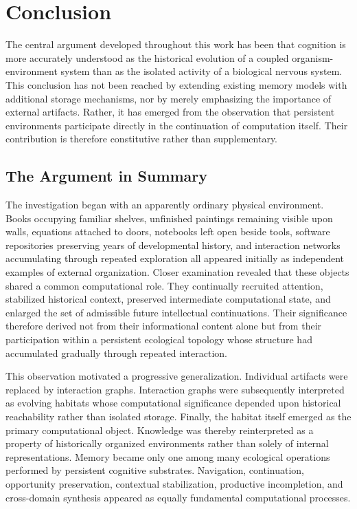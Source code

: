 \documentclass[12pt,oneside]{article}
\theoremstyle{remark}
\begin{document}

\section{Conclusion}

The central argument developed throughout this work has been that cognition is more accurately understood as the historical evolution of a coupled organism-environment system than as the isolated activity of a biological nervous system. This conclusion has not been reached by extending existing memory models with additional storage mechanisms, nor by merely emphasizing the importance of external artifacts. Rather, it has emerged from the observation that persistent environments participate directly in the continuation of computation itself. Their contribution is therefore constitutive rather than supplementary.

\subsection{The Argument in Summary}

The investigation began with an apparently ordinary physical environment. Books occupying familiar shelves, unfinished paintings remaining visible upon walls, equations attached to doors, notebooks left open beside tools, software repositories preserving years of developmental history, and interaction networks accumulating through repeated exploration all appeared initially as independent examples of external organization. Closer examination revealed that these objects shared a common computational role. They continually recruited attention, stabilized historical context, preserved intermediate computational state, and enlarged the set of admissible future intellectual continuations. Their significance therefore derived not from their informational content alone but from their participation within a persistent ecological topology whose structure had accumulated gradually through repeated interaction.

This observation motivated a progressive generalization. Individual artifacts were replaced by interaction graphs. Interaction graphs were subsequently interpreted as evolving habitats whose computational significance depended upon historical reachability rather than isolated storage. Finally, the habitat itself emerged as the primary computational object. Knowledge was thereby reinterpreted as a property of historically organized environments rather than solely of internal representations. Memory became only one among many ecological operations performed by persistent cognitive substrates. Navigation, continuation, opportunity preservation, contextual stabilization, productive incompletion, and cross-domain synthesis appeared as equally fundamental computational processes.
\end{document}
